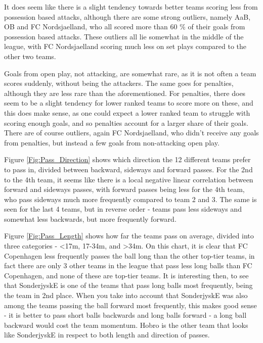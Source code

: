 \documentclass[Report.tex]{subfiles}
\begin{document}
It does seem like there is a slight tendency towards better teams scoring less
from possession based attacks, although there are some strong outliers, namely
AaB, OB and FC Nordsjaelland, who all scored more than 60 \% of their
goals from possession based attacks. These outliers all lie somewhat in the
middle of the league, with FC Nordsjaelland scoring much less on set plays
compared to the other two teams. 

Goals from open play, not attacking, are somewhat rare, as it is not often a
team scores suddenly, without being the attackers. The same goes for penalties,
although they are less rare than the aforementioned. For penalties, there does
seem to be a slight tendency for lower ranked teams to score more on these, and
this does make sense, as one could expect a lower ranked team to struggle with
scoring enough goals, and so penalties account for a larger share of their
goals. There are of course outliers, again FC Nordsjaelland, who didn't receive
any goals from penalties, but instead a few goals from non-attacking open play. 

Figure \ref{Fig:Pass_Direction} shows which direction the 12 different teams prefer to pass in,
divided between backward, sideways and forward passes. For the 2nd to the 4th
team, it seems like there is a local negative linear correlation between forward
and sideways passes, with forward passes being less for the 4th team, who pass
sideways much more frequently compared to team 2 and 3. The same is seen for the
last 4 teams, but in reverse order - teams pass less sideways and somewhat less
backwards, but more frequently forward. 

Figure \ref{Fig:Pass_Length} shows how far the teams pass on average, divided into three
categories - <17m, 17-34m, and >34m. 
On this chart, it is clear that FC Copenhagen less frequently passes the ball
long than the other top-tier teams, in fact there are only 3 other teams in the
league that pass less long balls than FC Copenhagen, and none of these are
top-tier teams. It is interesting then, to see that SonderjyskE is one of the
teams that pass long balls most frequently, being the team in 2nd place. When
you take into account that SonderjyskE was also among the teams passing the ball
forward most frequently, this makes good sense - it is better to pass short
balls backwards and long balls forward - a long ball backward would cost the
team momentum. Hobro is the other team that looks like SonderjyskE in respect to
both length and direction of passes. 
\end{document}
